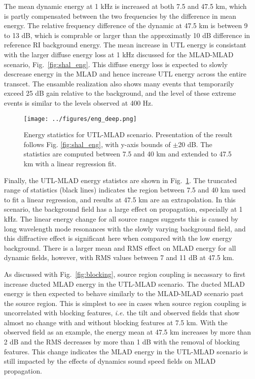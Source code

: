 \documentclass[preprint,NumberedRefs]{JASA}
\begin{document}
The mean dynamic energy at 1 kHz is increased at both 7.5 and 47.5 km, which is partly compensated between the two frequencies by the difference in mean energy. The relative frequency difference of the dynamic at 47.5 km is between 9 to 13 dB, which is comprable or larger than the approximatly 10 dB difference in reference RI background energy. The mean increase in UTL energy is consistant with the larger diffuse energy loss at 1 kHz discussed for the MLAD-MLAD scenario, Fig.~\ref{fig:shal_eng}. This diffuse energy loss is expected to slowly descrease energy in the MLAD and hence increase UTL energy across the entire transcet. The ensamble realization also shows many events that temporarily exceed 25 dB gain relative to the background, and the level of these extreme events is similar to the levels observed at 400 Hz.

\begin{figure}
\texttt{[image: ../figures/eng\_deep.png]}
    \caption{Energy statistics for UTL-MLAD scenario. Presentation of the result follows Fig. \ref{fig:shal_eng}, with y-axis bounds of $\pm$20 dB. The statistics are computed between 7.5 and 40 km and extended to 47.5 km with a linear regression fit.}
    \label{fig:deep_eng}
\end{figure}
Finally, the UTL-MLAD energy statistcs are shown in Fig.~\ref{fig:deep_eng}. The truncated range of statistics (black lines) indicates the region between 7.5 and 40 km used to fit a linear regression, and results at 47.5 km are an extrapolation. In this scenario, the background field has a large effect on propagation, especially at 1 kHz. The linear energy change for all source ranges suggests this is caused by long wavelength mode resonances with the slowly varying background field\cite{colosi21}, and this diffractive effect is significant here when compared with the low energy background. There is a larger mean and RMS effect on MLAD energy for all dynamic fields, however, with RMS values between 7 and 11 dB at 47.5 km.

As discussed with Fig.~\ref{fig:blocking}, source region coupling is necassary to first increase ducted MLAD energy in the UTL-MLAD scenario. The ducted MLAD energy is then expected to behave similarly to the MLAD-MLAD scenario past the source region. This is simplest to see in cases when source region coupling is uncorrelated with blocking features, \emph{i.e.} the tilt and observed fields that show almost no change with and without blocking features at 7.5 km. With the observed field as an example, the energy mean at 47.5 km increases by more than 2 dB and the RMS decreases by more than 1 dB with the removal of blocking features. This change indicates the MLAD energy in the UTL-MLAD scenario is still impacted by the effects of dynamics sound speed fields on MLAD propagation.
\end{document}

